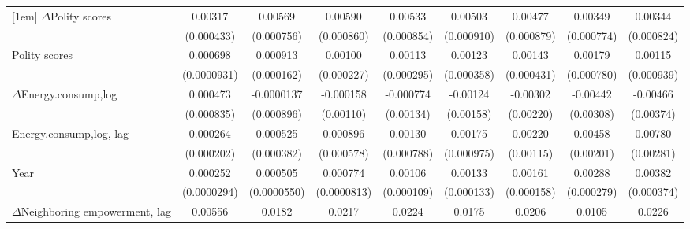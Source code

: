 \begin{table}[htbp]
\begin{tabular}{l*{8}{c}}
[1em]
$\Delta$Polity scores              &     0.00317\sym{***}&     0.00569\sym{***}&     0.00590\sym{***}&     0.00533\sym{***}&     0.00503\sym{***}&     0.00477\sym{***}&     0.00349\sym{***}&     0.00344\sym{***}\\
                    &  (0.000433)         &  (0.000756)         &  (0.000860)         &  (0.000854)         &  (0.000910)         &  (0.000879)         &  (0.000774)         &  (0.000824)         \\
[1em]
Polity scores         &    0.000698\sym{***}&    0.000913\sym{***}&     0.00100\sym{***}&     0.00113\sym{***}&     0.00123\sym{***}&     0.00143\sym{***}&     0.00179\sym{**} &     0.00115         \\
                    & (0.0000931)         &  (0.000162)         &  (0.000227)         &  (0.000295)         &  (0.000358)         &  (0.000431)         &  (0.000780)         &  (0.000939)         \\
[1em]
$\Delta$Energy.consump,log           &    0.000473         &  -0.0000137         &   -0.000158         &   -0.000774         &    -0.00124         &    -0.00302         &    -0.00442         &    -0.00466         \\
                    &  (0.000835)         &  (0.000896)         &   (0.00110)         &   (0.00134)         &   (0.00158)         &   (0.00220)         &   (0.00308)         &   (0.00374)         \\
[1em]
Energy.consump,log, lag            &    0.000264         &    0.000525         &    0.000896         &     0.00130         &     0.00175\sym{*}  &     0.00220\sym{*}  &     0.00458\sym{**} &     0.00780\sym{***}\\
                    &  (0.000202)         &  (0.000382)         &  (0.000578)         &  (0.000788)         &  (0.000975)         &   (0.00115)         &   (0.00201)         &   (0.00281)         \\
[1em]
Year                &    0.000252\sym{***}&    0.000505\sym{***}&    0.000774\sym{***}&     0.00106\sym{***}&     0.00133\sym{***}&     0.00161\sym{***}&     0.00288\sym{***}&     0.00382\sym{***}\\
                    & (0.0000294)         & (0.0000550)         & (0.0000813)         &  (0.000109)         &  (0.000133)         &  (0.000158)         &  (0.000279)         &  (0.000374)         \\
[1em]
$\Delta$Neighboring empowerment, lag&     0.00556         &      0.0182\sym{***}&      0.0217\sym{**} &      0.0224\sym{***}&      0.0175\sym{**} &      0.0206\sym{**} &      0.0105         &      0.0226\sym{*}  \\

\end{tabular}
\end{table}
